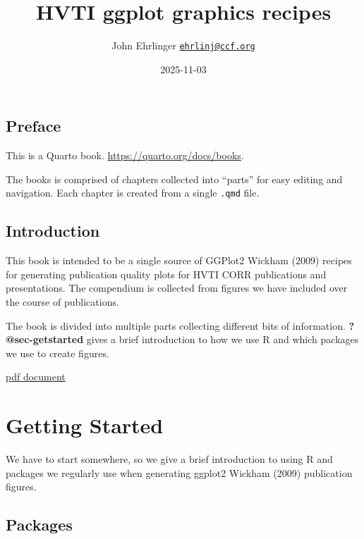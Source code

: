 \documentclass[
  letterpaper,
  DIV=11,
  numbers=noendperiod]{scrreprt}
\title{HVTI ggplot graphics recipes}
\author{John Ehrlinger
\href{mailto:ehrlinj@ccf.org}{\nolinkurl{ehrlinj@ccf.org}}}
\date{2025-11-03}
\renewcommand*\contentsname{Table of contents}
\newcommand\contentsname{Table of contents}
\begin{document}
\maketitle

\renewcommand*\contentsname{Table of contents}
{
\hypersetup{linkcolor=}
\setcounter{tocdepth}{2}
\tableofcontents
}


\chapter*{Preface}\label{preface}


This is a Quarto book. \url{https://quarto.org/docs/books}.

The books is comprised of chapters collected into ``parts'' for easy
editing and navigation. Each chapter is created from a single
\texttt{.qmd} file.


\chapter{Introduction}\label{introduction}

This book is intended to be a single source of GGPlot2 Wickham (2009)
recipes for generating publication quality plots for HVTI CORR
publications and presentations. The compendium is collected from figures
we have included over the course of publications.

The book is divided into multiple parts collecting different bits of
information. \textbf{?@sec-getstarted} gives a brief introduction to how
we use R and which packages we use to create figures.

\href{https://clevelandclinic.sharepoint.com/:b:/t/CORRDeptIntranet/EecPuzSkVclNhcPxHdxLCVoBm8-UzmOOq62UG_-EofpE7w?e=ZJmcrs}{pdf
document}

\part{Getting Started}

We have to start somewhere, so we give a brief introduction to using R
and packages we regularly use when generating ggplot2 Wickham (2009)
publication figures.

\chapter{Packages}\label{packages}
\end{document}
